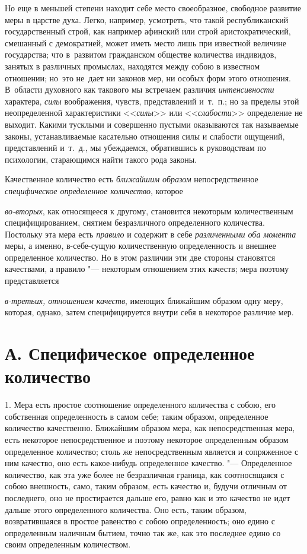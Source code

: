 Но еще в меньшей степени находит себе место своеобразное, свободное развитие
меры в царстве духа. Легко, например, усмотреть, что такой республиканский
государственный строй, как например афинский или строй аристократический,
смешанный с демократией, может иметь место лишь при известной величине
государства; что в~развитом гражданском обществе количества индивидов, занятых
в различных промыслах, находятся между собою в известном отношении; но~это
не~дает ни законов мер, ни особых форм этого отношения. В~области духовного
как такового мы встречаем различия {\em интенсивности} характера, {\em силы}
воображения, чувств, представлений и~т.~п.; но за пределы этой неопределенной
характеристики <<{\em силы}>> или <<{\em слабости}>> определение не выходит.
Какими тусклыми и совершенно пустыми оказываются так называемые законы,
устанавливаемые касательно отношения силы и слабости ощущений, представлений
и~т.~д., мы убеждаемся, обратившись к руководствам по психологии, старающимся
найти такого рода законы.


Качественное количество есть {\em ближайшим образом} непосредственное
{\em специфическое определенное количество}, которое

{\em во-вторых}, как относящееся к другому, становится некоторым количественным
специфицированием, снятием безразличного определенного количества. Постольку
эта мера есть {\em правило} и содержит в себе {\em различенными оба момента}
меры, а именно, в-себе-сущую количественную определенность и внешнее
определенное количество. Но в этом различии эти две стороны становятся
качествами, а правило "--- некоторым отношением этих качеств; мера поэтому
представляется

{\em в-третьих, отношением качеств}, имеющих ближайшим образом одну меру,
которая, однако, затем специфицируется внутри себя в некоторое различие мер.

\section[А. Специфическое определенное количество]%
{А. Специфическое определенное количество}

1. Мера есть простое соотношение определенного количества с собою, его
собственная определенность в самом себе; таким образом, определенное количество
качественно. Ближайшим образом мера, как непосредственная мера, есть некоторое
непосредственное и поэтому некоторое определенным образом определенное
количество; столь же непосредственным является и сопряженное с ним качество,
оно есть какое-нибудь определенное качество. "--- Определенное количество, как
эта уже более не безразличная граница, как соотносящаяся с собою внешность,
само, таким образом, есть качество и, будучи отличным от последнего, оно не
простирается дальше его, равно как и это качество не идет дальше этого
определенного количества. Оно есть, таким образом, возвратившаяся в простое
равенство с собою определенность; оно едино с определенным наличным бытием,
точно так же, как это последнее едино со своим определенным количеством.

